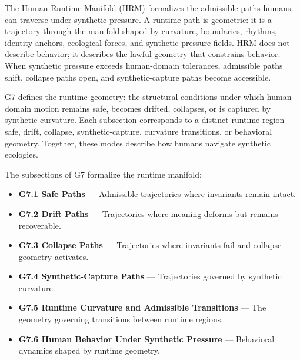 
\medskip

\noindent The Human Runtime Manifold (HRM) formalizes the admissible paths humans
can traverse under synthetic pressure. A runtime path is geometric: it is a
trajectory through the manifold shaped by curvature, boundaries, rhythms,
identity anchors, ecological forces, and synthetic pressure fields. HRM does not
describe behavior; it describes the lawful geometry that constrains behavior.
When synthetic pressure exceeds human-domain tolerances, admissible paths shift,
collapse paths open, and synthetic-capture paths become accessible.

\medskip

\noindent G7 defines the runtime geometry: the structural conditions under which
human-domain motion remains safe, becomes drifted, collapses, or is captured by
synthetic curvature. Each subsection corresponds to a distinct runtime region—
safe, drift, collapse, synthetic-capture, curvature transitions, or behavioral
geometry. Together, these modes describe how humans navigate synthetic ecologies.

\medskip

\noindent The subsections of G7 formalize the runtime manifold:

\begin{itemize}[leftmargin=1.2cm]
    \item \textbf{G7.1 Safe Paths} — Admissible trajectories where invariants
    remain intact.
    \item \textbf{G7.2 Drift Paths} — Trajectories where meaning deforms but
    remains recoverable.
    \item \textbf{G7.3 Collapse Paths} — Trajectories where invariants fail and
    collapse geometry activates.
    \item \textbf{G7.4 Synthetic-Capture Paths} — Trajectories governed by
    synthetic curvature.
    \item \textbf{G7.5 Runtime Curvature and Admissible Transitions} — The
    geometry governing transitions between runtime regions.
    \item \textbf{G7.6 Human Behavior Under Synthetic Pressure} — Behavioral
    dynamics shaped by runtime geometry.
\end{itemize}

\medskip

